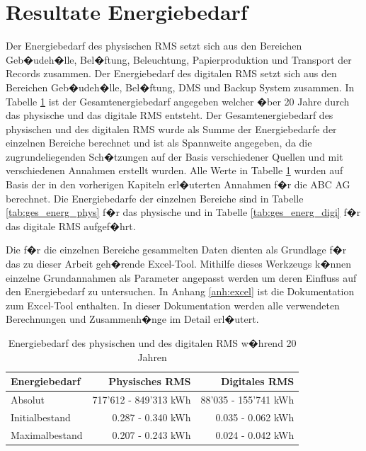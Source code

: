 \documentclass[a4paper,twoside,10pt]{report}
\begin{document}
\section{Resultate Energiebedarf} \label{sec:energ_physisch}
Der Energiebedarf des physischen \ac{RMS} setzt sich aus den Bereichen Geb�udeh�lle, Bel�ftung, Beleuchtung, Papierproduktion und Transport der Records zusammen. Der Energiebedarf des digitalen \ac{RMS} setzt sich aus den Bereichen Geb�udeh�lle, Bel�ftung, \ac{DMS} und Backup System zusammen. In Tabelle \ref{tab:ges_energ_comp} ist der Gesamtenergiebedarf angegeben welcher �ber 20 Jahre durch das physische und das digitale \ac{RMS} entsteht. Der Gesamtenergiebedarf des physischen und des digitalen \ac{RMS} wurde als Summe der Energiebedarfe der einzelnen Bereiche berechnet und ist als Spannweite angegeben, da die zugrundeliegenden Sch�tzungen auf der Basis verschiedener Quellen und mit verschiedenen Annahmen erstellt wurden. Alle Werte in Tabelle \ref{tab:ges_energ_comp} wurden auf Basis der in den vorherigen Kapiteln erl�uterten Annahmen f�r die ABC AG berechnet. Die Energiebedarfe der einzelnen Bereiche sind in Tabelle \ref{tab:ges_energ_phys} f�r das physische und in Tabelle \ref{tab:ges_energ_digi} f�r das digitale \ac{RMS} aufgef�hrt.

Die f�r die einzelnen Bereiche gesammelten Daten dienten als Grundlage f�r das zu dieser Arbeit geh�rende Excel-Tool. Mithilfe dieses Werkzeugs k�nnen einzelne Grundannahmen als Parameter angepasst werden um deren Einfluss auf den Energiebedarf zu untersuchen. In Anhang \ref{anh:excel} ist die Dokumentation zum Excel-Tool enthalten. In dieser Dokumentation werden alle verwendeten Berechnungen und Zusammenh�nge im Detail erl�utert.

\begin{table} [h]
	\begin{tabular}{l|r|r}
	\hline
	\textbf{Energiebedarf} & \textbf{Physisches RMS} & \textbf{Digitales RMS}\\
	\hline
	Absolut  				& 717'612 - 849'313	kWh			& 88'035 - 155'741 kWh\\
	Initialbestand  & 0.287 - 0.340	kWh					& 0.035 - 0.062 kWh\\
	Maximalbestand 	& 0.207 - 0.243	kWh				 	& 0.024 - 0.042 kWh\\
	\hline
	\end{tabular}
\caption{Energiebedarf des physischen und des digitalen RMS w�hrend 20 Jahren} 
\label{tab:ges_energ_comp}
\end{table}
\end{document}
